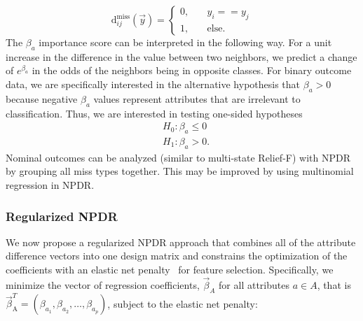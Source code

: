 \documentclass[10pt]{article}
\begin{document}
\begin{equation}\label{eq:hitdiff}
\text{d}^{\text{miss}}_{ij}(\vec{y}) = \left\{
    \begin{array}{ll}
        0, & \quad  y_{i} == y_{j} \\
        1, & \quad \text{else}.
    \end{array}
\right.
\end{equation}
The $\beta_a$ importance score can be interpreted in the following way. For a unit increase in the difference in the value between two neighbors, we predict a change of $e^{\beta_a}$ in the odds of the neighbors being in opposite classes. For binary outcome data, we are specifically interested in the alternative hypothesis that $\beta_a>0$ because negative $\beta_a$ values represent attributes that are irrelevant to classification. Thus, we are interested in testing one-sided hypotheses
\begin{equation}
\begin{aligned}
    & H_0: \beta_a \le 0 \\
    & H_1: \beta_a > 0.
\end{aligned}
\end{equation}
Nominal outcomes can be analyzed (similar to multi-state Relief-F) with NPDR by grouping all miss types together. This may be improved by using multinomial regression in NPDR. 

\subsubsection{Regularized NPDR}

We now propose a regularized NPDR approach that combines all of the attribute difference vectors into one design matrix and constrains the optimization of the coefficients with an elastic net penalty~\cite{glmnet05} for feature selection.
Specifically, we minimize the vector of regression coefficients, $ \vec{\beta}_A$ for all attributes $a \in A$, that is $\vec{\beta}^{T}_{\text{A}} = (\beta_{a_1}, \beta_{a_2}, \ldots, \beta_{a_p})$, subject to the elastic net penalty: 
\end{document}
